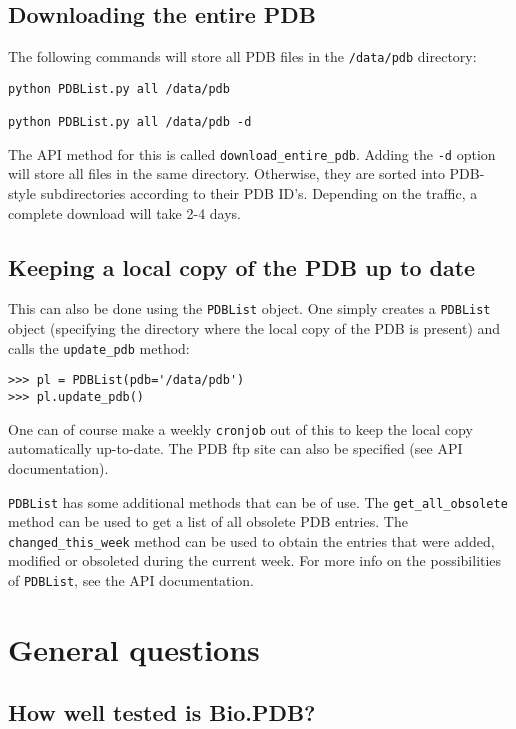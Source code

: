 \subsection{Downloading the entire PDB}

The following commands will store all PDB files in the \texttt{/data/pdb}
directory:

\begin{verbatim}
python PDBList.py all /data/pdb

python PDBList.py all /data/pdb -d
\end{verbatim}
\noindent The API method for this is called \texttt{download\_entire\_pdb}.
Adding the \texttt{-d} option will store all files in the same directory.
Otherwise, they are sorted into PDB-style subdirectories according
to their PDB ID's. Depending on the traffic, a complete download will
take 2-4 days.

\subsection{Keeping a local copy of the PDB up to date}

This can also be done using the \texttt{PDBList} object. One simply
creates a \texttt{PDBList} object (specifying the directory where
the local copy of the PDB is present) and calls the \texttt{update\_pdb}
method:

\begin{verbatim}
>>> pl = PDBList(pdb='/data/pdb')
>>> pl.update_pdb()
\end{verbatim}
One can of course make a weekly \texttt{cronjob} out of this to keep
the local copy automatically up-to-date. The PDB ftp site can also
be specified (see API documentation).

\texttt{PDBList} has some additional methods that can be of use. The
\texttt{get\_all\_obsolete} method can be used to get a list of all
obsolete PDB entries. The \texttt{changed\_this\_week} method can
be used to obtain the entries that were added, modified or obsoleted
during the current week. For more info on the possibilities of \texttt{PDBList},
see the API documentation.

\section{General questions}

\subsection{How well tested is Bio.PDB?}

